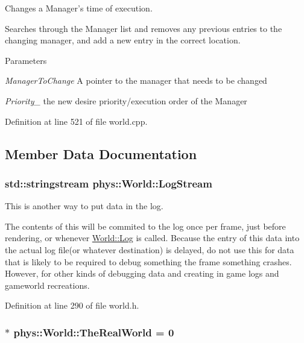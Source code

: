 Changes a Manager's time of execution. 

Searches through the Manager list and removes any previous entries to the changing manager, and add a new entry in the correct location. 
\begin{DoxyParams}{Parameters}
\item[{\em ManagerToChange}]A pointer to the manager that needs to be changed \item[{\em Priority\_\-}]the new desire priority/execution order of the Manager \end{DoxyParams}


Definition at line 521 of file world.cpp.



\subsection{Member Data Documentation}
\hypertarget{classphys_1_1World_a6d8b325a077afc924afb70c259ec0299}{
\subsubsection[{LogStream}]{\setlength{\rightskip}{0pt plus 5cm}std::stringstream {\bf phys::World::LogStream}}}
\label{da/ddf/classphys_1_1World_a6d8b325a077afc924afb70c259ec0299}


This is another way to put data in the log. 

The contents of this will be commited to the log once per frame, just before rendering, or whenever \hyperlink{classphys_1_1World_a05267a20e8d5518771d0848190b33d60}{World::Log} is called. Because the entry of this data into the actual log file(or whatever destination) is delayed, do not use this for data that is likely to be required to debug something the frame something crashes. However, for other kinds of debugging data and creating in game logs and gameworld recreations. 

Definition at line 290 of file world.h.

\hypertarget{classphys_1_1World_a78f9e764aa85ac44d6f7fa7158377757}{
\subsubsection[{TheRealWorld}]{ $\ast$ {\bf phys::World::TheRealWorld} = 0}}
\label{da/ddf/classphys_1_1World_a78f9e764aa85ac44d6f7fa7158377757}


